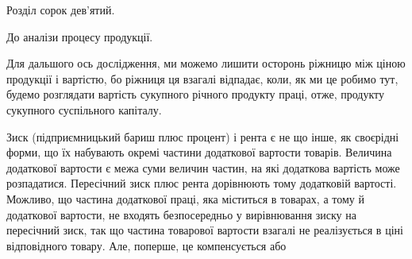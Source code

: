 Розділ сорок дев’ятий.

До аналізи процесу продукції.

Для дальшого ось дослідження, ми можемо лишити осторонь ріжницю між
ціною продукції і вартістю, бо ріжниця ця взагалі відпадає, коли, як ми це
робимо тут, будемо розглядати вартість сукупного річного продукту праці, отже,
продукту сукупного суспільного капіталу.

Зиск (підприємницький бариш плюс процент) і рента є не що інше, як
своєрідні форми, що їх набувають окремі частини додаткової вартости товарів.
Величина додаткової вартости є межа суми величин частин, на які додаткова
вартість може розпадатися. Пересічний зиск плюс рента дорівнюють
тому додатковій вартості. Можливо, що частина додаткової праці, яка міститься
в товарах, а тому й додаткової вартости, не входять безпосередньо у вирівнювання
зиску на пересічний зиск, так що частина товарової вартости взагалі не
реалізується в ціні відповідного товару. Але, поперше, це компенсується або
\parbreak{}  %
